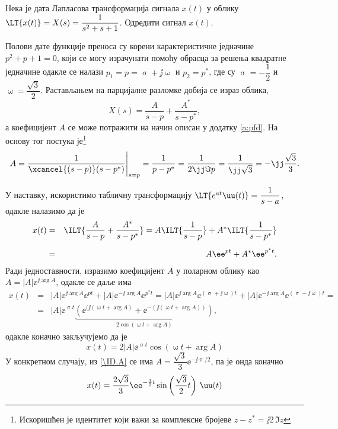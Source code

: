 \PID \label{z:damp_sin}
Нека је дата Лапласова трансформација сигнала $x(t)$ у облику $\LT{x(t)} = X(s) = \dfrac{1}{s^2 + s + 1}$. Одредити 
сигнал $x(t)$. 

\RESENJE  Полови дате функције преноса су корени карактеристичне једначине 
$p^2 + p + 1 = 0$, који се могу израчунати помоћу обрасца за решења квадратне једначине одакле се налази
$p_{1} = p = \upsigma + \jj\upomega$ и $p_2 = p^\ast$, где су $\upsigma = -\dfrac12$ и $ \upomega = \dfrac{\sqrt{3}}{2}$. 
Растављањем на парцијалне разломке добија се израз облика,
\begin{equation}
    X(s) = \dfrac{A}{s - p} + \dfrac{A^\ast}{s - p^\ast},
\end{equation}
а коефицијент $A$ се може потражити на начин описан у додатку \ref{a:pfd}. На основу тог постука 
је\footnote{Искоришћен је идентитет који важи за комплексне бројеве 
$z - z^\ast = \jj 2 \, \Im{z}$} 
\begin{equation}
    A = \dfrac{1}{\xcancel{(s - p)}(s - p^\ast)} \Bigg|_{s = p} 
      = \dfrac{1}{p - p^\ast} = \dfrac{1}{2 \jj \Im{p} } = \dfrac{1}{\jj\sqrt{3}} = -\jj \dfrac{\sqrt{3}}{3}. \label{\ID.A}
\end{equation}

У наставку, искористимо табличну трансформацију $\LT{e^{at}\uu(t)} = \dfrac{1}{s - a}$, одакле налазимо да је 
\begin{eqnarray}
x(t) &=& \ILT{ \dfrac{A}{s - p} + \dfrac{A^\ast}{s - p^\ast} } = 
       A \ILT{ \dfrac{1}{s - p}} + A^\ast \ILT{ \dfrac{1}{s - p^{\ast}}}  \\[2mm]
     &=&
     A \ee^{pt} + A^* \ee^{p^\ast t}.
\end{eqnarray}
Ради једноставности, изразимо коефицијент $A$ у поларном облику као $A = |A| \ee^{\jj\arg{A}}$, одакле се даље има
\begin{eqnarray}
    x(t) &=&
    |A| \ee^{\jj \arg{A}} \ee^{pt} + |A| \ee^{-\jj \arg{A}} \ee^{p^\ast t} = 
    |A| \ee^{\jj \arg{A}} \ee^{(\upsigma + \jj\upomega)t} + |A| \ee^{-\jj \arg{A}} \ee^{(\upsigma - \jj\upomega) t} = \\
    &=&
    |A| \ee^{\upsigma t} 
    \underbrace{
    \left( 
        \ee^{(\jj(\upomega t + \arg A) } + \ee^{ -(\jj(\upomega t + \arg A)) } 
    \right)}_{ 2\cos(\upomega t + \arg A) },
\end{eqnarray}
одакле коначно закључујемо да је 
\begin{equation}
    x(t) = 2|A| \ee^{\upsigma t} \cos(\upomega t + \arg A)
\end{equation}
У конкретном случају, из \eqref{\ID.A} се има $A = \dfrac{\sqrt 3}{3} \ee^{-\jj\uppi/2}$, па је онда коначно
\begin{equation}
    x(t) = \dfrac{2\sqrt 3}{3} \ee^{-\frac{1}{2}t} \sin \left(\dfrac{\sqrt 3}{2} t\right) \, \uu(t)
\end{equation}